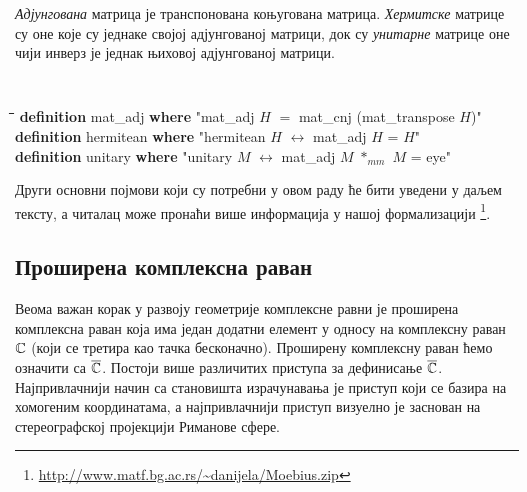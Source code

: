 \emph{Адјунгована} матрица је транспонована коњугована
матрица. \emph{Хермитске} матрице су оне које су једнаке својој
адјунгованој матрици, док су \emph{унитарне} матрице оне чији инверз је
једнак њиховој адјунгованој матрици.
{\tt
\begin{tabbing}
\hspace{5mm}\=\hspace{5mm}\=\hspace{5mm}\=\hspace{5mm}\=\hspace{5mm}\=\kill
\textbf{definition} mat\_adj \textbf{where} "mat\_adj $H$ $=$ mat\_cnj (mat\_transpose $H$)"\\
\textbf{definition} hermitean \textbf{where} "hermitean $H$ $\longleftrightarrow$ mat\_adj $H$ = $H$"\\
\textbf{definition} unitary \textbf{where} "unitary $M$ $\longleftrightarrow$ mat\_adj $M$ $*_{mm}$  $M$ = eye"
\end{tabbing}
}

Други основни појмови који су потребни у овом раду ће бити уведени у
даљем тексту, а читалац може пронаћи више информација у нашој
формализацији \footnote{\url{http://www.matf.bg.ac.rs/~danijela/Moebius.zip}}.

\label{sec:main}

\subsection{Проширена комплексна раван}
\label{subsec:extc}
Веома важан корак у развоју геометрије комплексне равни је проширена
комплексна раван која има један додатни елемент у односу на комплексну
раван $\mathbb{C}$ (који се третира као тачка бесконачно). Проширену
комплексну раван ћемо означити са $\overline{\mathbb{C}}$. Постоји више различитих
приступа \cite{needham,schwerdtfeger} за дефинисање
$\overline{\mathbb{C}}$. Најпривлачнији начин са становишта израчунавања је приступ
који се базира на хомогеним координатама, а најпривлачнији приступ
визуелно је заснован на стереографској пројекцији Риманове сфере.



